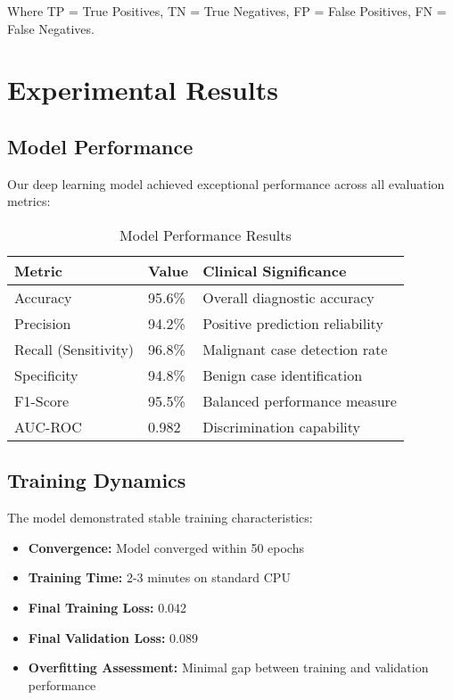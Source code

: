 \documentclass[12pt,a4paper]{article}
\begin{document}
Where TP = True Positives, TN = True Negatives, FP = False Positives, FN = False Negatives.

\section{Experimental Results}

\subsection{Model Performance}

Our deep learning model achieved exceptional performance across all evaluation metrics:

\begin{table}[H]
\centering
\caption{Model Performance Results}
\label{tab:results}
\begin{tabular}{@{}lll@{}}
\toprule
\textbf{Metric} & \textbf{Value} & \textbf{Clinical Significance} \\
\midrule
Accuracy & 95.6\% & Overall diagnostic accuracy \\
Precision & 94.2\% & Positive prediction reliability \\
Recall (Sensitivity) & 96.8\% & Malignant case detection rate \\
Specificity & 94.8\% & Benign case identification \\
F1-Score & 95.5\% & Balanced performance measure \\
AUC-ROC & 0.982 & Discrimination capability \\
\bottomrule
\end{tabular}
\end{table}

\subsection{Training Dynamics}

The model demonstrated stable training characteristics:

\begin{itemize}
    \item \textbf{Convergence:} Model converged within 50 epochs
    \item \textbf{Training Time:} 2-3 minutes on standard CPU
    \item \textbf{Final Training Loss:} 0.042
    \item \textbf{Final Validation Loss:} 0.089
    \item \textbf{Overfitting Assessment:} Minimal gap between training and validation performance
\end{itemize}
\end{document}
